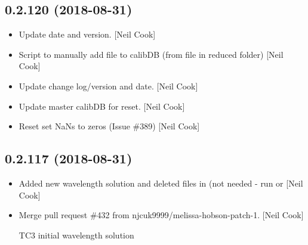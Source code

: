 \documentclass[a4paper,10pt,english]{report}
\begin{document}
\subsection{0.2.120 (2018-08-31)}
\label{\detokenize{misc/changelog:id342}}\begin{itemize}
\item {} 
Update date and version. {[}Neil Cook{]}

\item {} 
Script to manually add file to calibDB (from file in reduced folder)
{[}Neil Cook{]}

\item {} 
Update change log/version and date. {[}Neil Cook{]}

\item {} 
Update master calibDB for reset. {[}Neil Cook{]}

\item {} 
Reset  set NaNs to zeros (Issue \#389) {[}Neil Cook{]}

\end{itemize}


\subsection{0.2.117 (2018-08-31)}
\label{\detokenize{misc/changelog:id343}}\begin{itemize}
\item {} 
Added new wavelength solution and deleted files in  (not
needed - run  or  {[}Neil Cook{]}

\item {} 
Merge pull request \#432 from njcuk9999/melissa-hobson-patch-1. {[}Neil
Cook{]}

TC3 initial wavelength solution

\end{itemize}
\end{document}
